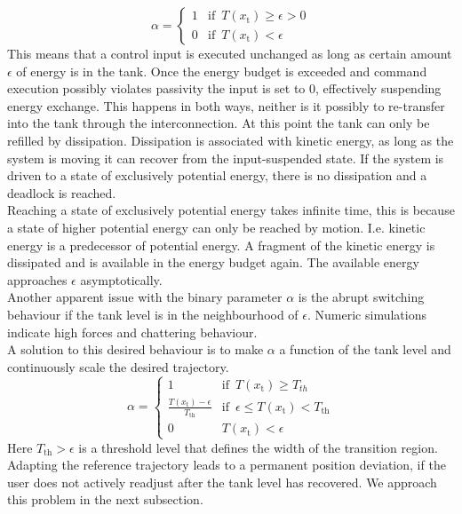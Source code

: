 \documentclass[a4paper,twoside, openright,12pt]{report}
\newcommand{\g}[1]{\text{#1}}
\begin{document}
{\begin{equation}
\alpha = \begin{cases}
1 & \text{if } \, T(x_\g{t})\geq\epsilon>0 \\
0 & \text{if } \, T(x_\g{t}) < \epsilon
\end{cases}
\end{equation}
This means that a control input is executed unchanged as long as certain amount $\epsilon$ of energy is in the tank. Once the energy budget is exceeded and command execution possibly violates passivity the input is set to $0$, effectively suspending energy exchange. This happens in both ways, neither is it possibly to re-transfer into the tank through the interconnection. At this point the tank can only be refilled by dissipation. Dissipation is associated with kinetic energy, as long as the system is moving it can recover from the input-suspended state. If the system is driven to a state of exclusively potential energy, there is no dissipation and a deadlock is reached.\\
Reaching a state of exclusively potential energy takes infinite time, this is because a state of higher potential energy can only be reached by motion. I.e. kinetic energy is a predecessor of potential energy. A fragment of the kinetic energy is dissipated and is available in the energy budget again. The available energy approaches $\epsilon$ asymptotically.\\
Another apparent issue with the binary parameter $\alpha$ is the abrupt switching behaviour if the tank level is in the neighbourhood of $\epsilon$. Numeric simulations indicate high forces and chattering behaviour.\\
A solution to this desired behaviour is to make $\alpha$ a function of the tank level and continuously scale the desired trajectory.
\begin{equation}
\alpha = \begin{cases}
1 & \text{if } \, T(x_\g{t})\geq T_{th} \\
\frac{T(x_\g{t})-\epsilon}{T_{\g{th}}} & \text{if } \, \epsilon \leq T(x_\g{t}) < T_{\g{th}} \\
0 & T(x_\g{t}) < \epsilon
\end{cases}
\end{equation}
Here $T_{\g{th}} > \epsilon$ is a threshold level that defines the width of the transition region. Adapting the reference trajectory leads to a permanent position deviation, if the user does not actively readjust after the tank level has recovered. We approach this problem in the next subsection.\\ 
}
\end{document}
